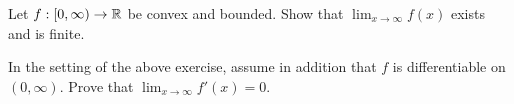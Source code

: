 \documentclass[../analysis1.tex]{subfiles}
\begin{document}
\begin{exercise*}
    Let $f:[0,\infty)\to\mathbb{R}$ be convex and bounded. Show that $\lim_{x\to\infty}f(x)$ exists and is finite.
\end{exercise*}

\begin{exercise*}
    In the setting of the above exercise, assume in addition that $f$ is differentiable on $(0,\infty)$. Prove that $\lim_{x\to\infty}f'(x)=0$.
\end{exercise*}
\end{document}
